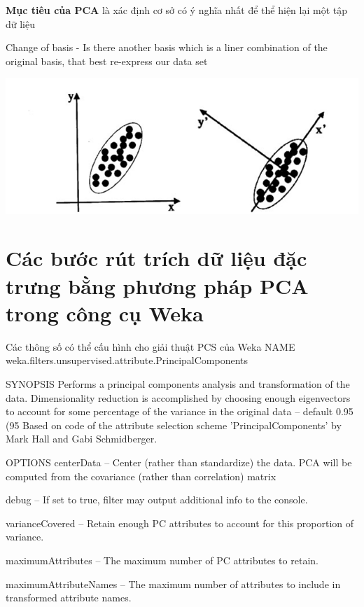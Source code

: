 \documentclass{hcmutarticle}
\begin{document}
\textbf{Mục tiêu của PCA } là xác định cơ sở có ý nghĩa nhất để thể hiện lại một tập dữ liệu


Change of basis
- Is there another basis which is a liner combination of the original basis, that best re-express our data set


\begin{center}
	\includegraphics[scale=0.5]{image/figure.png}
\end{center}
\section{Các bước rút trích dữ liệu đặc trưng bằng phương pháp PCA trong công cụ Weka}

Các thông số có thể cấu hình cho giải thuật PCS của Weka
NAME
weka.filters.unsupervised.attribute.PrincipalComponents

SYNOPSIS
Performs a principal components analysis and transformation of the data.
Dimensionality reduction is accomplished by choosing enough eigenvectors to account for some percentage of the variance in the original data -- default 0.95 (95%
Based on code of the attribute selection scheme 'PrincipalComponents' by Mark Hall and Gabi Schmidberger.

OPTIONS
centerData -- Center (rather than standardize) the data. PCA will be computed from the covariance (rather than correlation) matrix

debug -- If set to true, filter may output additional info to the console.

varianceCovered -- Retain enough PC attributes to account for this proportion of variance.

maximumAttributes -- The maximum number of PC attributes to retain.

maximumAttributeNames -- The maximum number of attributes to include in transformed attribute names.
\end{document}
